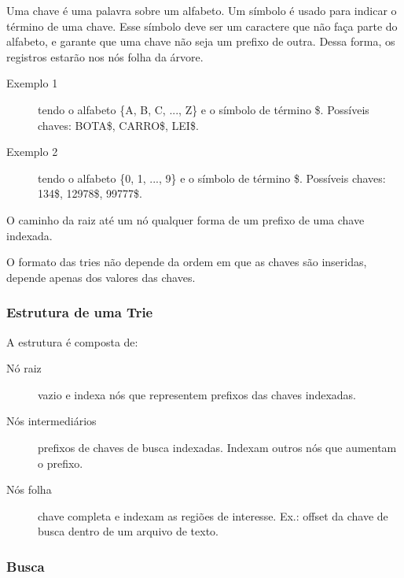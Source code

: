 Uma chave é uma palavra sobre um alfabeto. 
Um símbolo é usado para indicar o término de uma chave. 
Esse símbolo deve ser um caractere que não faça parte do alfabeto, e garante
que uma chave não seja um prefixo de outra.
Dessa forma, os registros estarão nos nós folha da árvore.
%
\begin{description}
\item[Exemplo 1] tendo o alfabeto \{A, B, C, ..., Z\} e o símbolo
de término \$. Possíveis chaves: BOTA\$, CARRO\$, LEI\$.

\item[Exemplo 2] tendo o alfabeto \{0, 1, ..., 9\} e o símbolo de término \$.
Possíveis chaves: 134\$, 12978\$, 99777\$.
\end{description}
O caminho da raiz até um nó qualquer forma de um prefixo de uma chave indexada.

O formato das tries não depende da ordem em que as chaves são inseridas, depende
apenas dos valores das chaves.

\subsubsection{Estrutura de uma Trie}

A estrutura é composta de:
\begin{description}
\item[Nó raiz]  vazio e indexa nós que representem prefixos das chaves indexadas.
\item[Nós intermediários] prefixos de chaves de busca indexadas. Indexam outros nós
que aumentam o prefixo.
\item[Nós folha] chave completa e indexam as regiões de interesse. Ex.: offset da chave
de busca dentro de um arquivo de texto.
\end{description}

\subsubsection{Busca}

